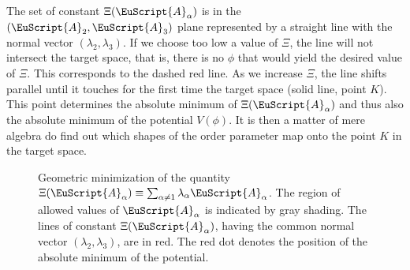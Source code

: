\documentclass[final,3p,times,12pt,a4paper,sort&compress]{elsarticle}
\newcommand\AP{\EuScript{A}}                %
\begin{document}
The set of constant $\Xi(\AP_\alpha)$ is in the $(\AP_2,\AP_3)$ plane
represented by a straight line with the normal vector $(\lambda_2,\lambda_3)$.
If we choose too low a value of $\Xi$, the line will not intersect the target
space, that is, there is no $\phi$ that would yield the desired value of
$\Xi$. This corresponds to the dashed red line. As we increase $\Xi$, the line
shifts parallel until it touches for the first time the target space (solid
line, point $K$). This point determines the absolute minimum of
$\Xi(\AP_\alpha)$ and thus also the absolute minimum of the potential
$V(\phi)$. It is then a matter of mere algebra do find out which shapes of the
order parameter map onto the point $K$ in the target space.
\begin{figure}
\begin{center}
\end{center}
\caption{Geometric minimization of the quantity
$\Xi(\AP_\alpha)\equiv\sum_{\alpha\neq1}\lambda_\alpha\AP_\alpha$. The region
of allowed values of $\AP_\alpha$ is indicated by gray shading. The lines of
constant $\Xi(\AP_\alpha)$, having the common normal vector
$(\lambda_2,\lambda_3)$, are in red. The red dot denotes the position of the
absolute minimum of the potential.}
\label{fig:Kim}
\end{figure}
\end{document}
